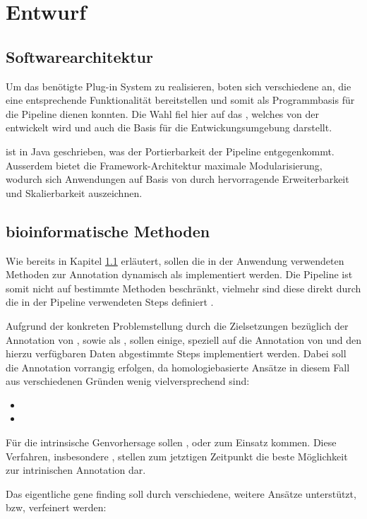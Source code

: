 \chapter{Entwurf}

\section{Softwarearchitektur}\label{chp:softwarearchitektur}
Um das benötigte Plug-in System zu realisieren, boten sich verschiedene
 an, die eine entsprechende Funktionalität
bereitstellen und somit als Programmbasis für die  Pipeline dienen konnten.
Die Wahl fiel hier auf das  , welches von
der  entwickelt wird und auch die Basis für die
Entwickungsumgebung  darstellt.

 ist in Java geschrieben, was der Portierbarkeit der
Pipeline entgegenkommt. Ausserdem bietet die Framework-Architektur maximale
Modularisierung, wodurch sich Anwendungen auf Basis von 
durch hervorragende Erweiterbarkeit und Skalierbarkeit auszeichnen.




\section{bioinformatische Methoden}
Wie bereits in Kapitel \ref{chp:softwarearchitektur} erläutert, sollen die in
der Anwendung verwendeten Methoden zur Annotation dynamisch als 
implementiert werden. Die Pipeline ist somit nicht auf bestimmte Methoden
beschränkt, vielmehr sind diese direkt durch die in der Pipeline verwendeten
Steps definiert .

Aufgrund der konkreten Problemstellung durch die Zielsetzungen bezüglich der
Annotation von , sowie als ,
sollen einige, speziell auf die Annotation von  und den
hierzu verfügbaren Daten abgestimmte Steps implementiert werden.
Dabei soll die Annotation vorrangig  
erfolgen, da homologiebasierte Ansätze in diesem Fall aus verschiedenen Gründen
wenig vielversprechend sind:
\begin{itemize}
\item {}
\item {}
\end{itemize}
Für die intrinsische Genvorhersage sollen  , oder   zum
Einsatz kommen.
Diese Verfahren, insbesondere , stellen zum
jetztigen Zeitpunkt die beste Möglichkeit zur intrinischen Annotation dar.

Das eigentliche gene finding soll durch verschiedene, weitere Ansätze
unterstützt, bzw, verfeinert werden:


 
